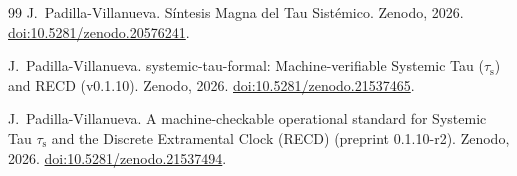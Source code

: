 \documentclass[11pt,a4paper]{article}
\newcommand{\taus}{\tau_{\mathrm{s}}}
\begin{document}
\begin{thebibliography}{99}
J.~Padilla-Villanueva.
\newblock Síntesis Magna del Tau Sistémico.
\newblock Zenodo, 2026.
\newblock \href{https://doi.org/10.5281/zenodo.20576241}{doi:10.5281/zenodo.20576241}.

J.~Padilla-Villanueva.
\newblock systemic-tau-formal: Machine-verifiable Systemic Tau (\(\taus\)) and RECD (v0.1.10).
\newblock Zenodo, 2026.
\newblock \href{https://doi.org/10.5281/zenodo.21537465}{doi:10.5281/zenodo.21537465}.

J.~Padilla-Villanueva.
\newblock A machine-checkable operational standard for Systemic Tau \(\taus\) and the Discrete Extramental Clock (RECD) (preprint 0.1.10-r2).
\newblock Zenodo, 2026.
\newblock \href{https://doi.org/10.5281/zenodo.21537494}{doi:10.5281/zenodo.21537494}.

\end{thebibliography}
\end{document}
